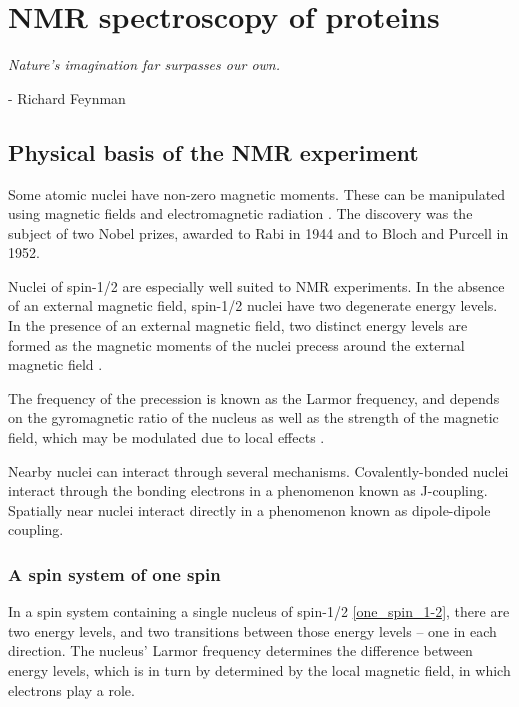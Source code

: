 \chapter{NMR spectroscopy of proteins}
\begin{center}
  \textit{Nature's imagination far surpasses our own.}

 - Richard Feynman
\end{center}


\section{Physical basis of the NMR experiment}

Some atomic nuclei have non-zero magnetic moments. These can be manipulated 
using magnetic fields and electromagnetic radiation 
\cite{bloch1946nuclear, rabi1938}.  The discovery was the subject of two 
Nobel prizes, awarded to Rabi in 1944 and to Bloch and Purcell in 1952.

Nuclei of spin-1/2 are especially well suited to NMR experiments.  In the 
absence of an external magnetic field, spin-1/2 nuclei have two degenerate 
energy levels.  In the presence of an external magnetic field, two distinct 
energy levels are formed as the magnetic moments of the nuclei precess 
around the external magnetic field \cite{hahn1950spin, bloembergen1948relaxation}.

The frequency of the precession is known as the Larmor frequency, and depends 
on the gyromagnetic ratio of the nucleus as well as the strength of the 
magnetic field, which may be modulated due to local effects
\cite{carr1954effects, meiboom1958modified}.

Nearby nuclei can interact through several mechanisms.  Covalently-bonded nuclei
interact through the bonding electrons in a phenomenon known as J-coupling.
Spatially near nuclei interact directly in a phenomenon known as dipole-dipole
coupling.


\subsection*{A spin system of one spin}

In a spin system containing a single nucleus of spin-1/2 \ref{one_spin_1-2},
there are two energy levels, and two transitions between those energy levels
-- one in each direction.  The nucleus' Larmor frequency determines the 
difference between energy levels, which is in turn by determined by the 
local magnetic field, in which electrons play a role.

